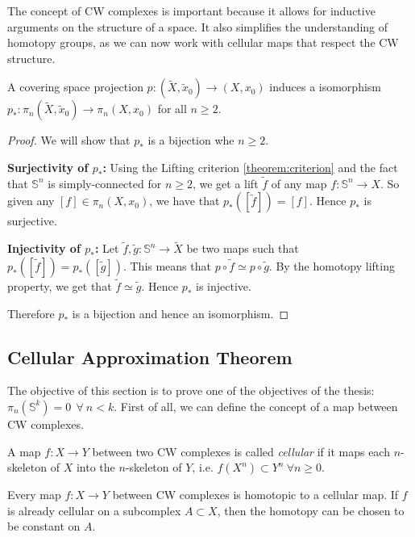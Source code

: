 \documentclass[12pt]{article}
\begin{document}
The concept of CW complexes is important because it allows for inductive arguments on the structure of a space. It also simplifies the understanding of homotopy groups, as we can now work with cellular maps that respect the CW structure.

\begin{proposition}
	A covering space projection \(p : (\tilde{X}, \tilde{x}_0) \rightarrow (X, x_0)\) induces a isomorphism \(p_* : \pi_n(\tilde{X}, \tilde{x}_0) \rightarrow \pi_n(X, x_0)\) for all \(n \geq 2\).
\end{proposition}

\begin{proof}
	We will show that \(p_*\) is a bijection whe \(n \geq 2\).

	\textbf{Surjectivity of \(p_*\):} Using the Lifting criterion \ref{theorem:criterion} and the fact that \(\mathbb{S}^n\) is simply-connected for \(n \geq 2\), we get a lift \(\tilde{f}\) of any map \(f : \mathbb{S}^n \rightarrow X\). So given any \([f] \in \pi_n(X, x_0)\), we have that \(p_*([\tilde{f}]) = [f]\). Hence \(p_*\) is surjective.

	\textbf{Injectivity of \(p_*\):} Let \(\tilde{f}, \tilde{g} : \mathbb{S}^n \rightarrow \tilde{X}\) be two maps such that \(p_*([\tilde{f}]) = p_*([\tilde{g}])\). This means that \(p \circ \tilde{f} \simeq p \circ \tilde{g}\). By the homotopy lifting property, we get that \(\tilde{f} \simeq \tilde{g}\). Hence \(p_*\) is injective.

	Therefore \(p_*\) is a bijection and hence an isomorphism.
\end{proof}

\subsection{Cellular Approximation Theorem}

The objective of this section is to prove one of the objectives of the thesis: \(\pi_n(\mathbb{S}^k) = 0 \ \ \forall \ n < k\). First of all, we can define the concept of a map between CW complexes.

\begin{definition}
	A map \(f : X \rightarrow Y\) between two CW complexes is called \textit{cellular} if it maps each \(n\)-skeleton of \(X\) into the \(n\)-skeleton of \(Y\), i.e. \(f(X^n) \subset Y^n \ \forall n \geq 0\).
\end{definition}

\begin{theorem}
	Every map \(f : X \rightarrow Y\) between CW complexes is homotopic to a cellular map. If \(f\) is already cellular on a subcomplex \(A \subset X\), then the homotopy can be chosen to be constant on \(A\).
\end{theorem}
\end{document}
